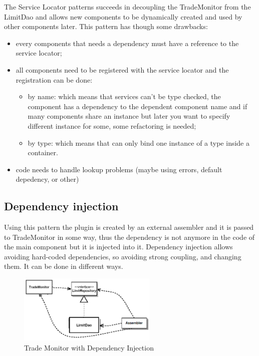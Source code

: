 The Service Locator patterns succeeds in decoupling the TradeMonitor from the LimitDao and allows new components to be dynamically created and used by other components later.
This pattern has though some drawbacks:
\begin{itemize}
    \item every components that needs a dependency must have a reference to the service locator;
    \item all components need to be registered with the service locator and the registration can be done:
    \begin{itemize}
        \item by name: which means that services can't be type checked, the component has a dependency to the dependent component name and if many components share an instance but later you want to specify different instance for some, some refactoring is needed;

        \item by type: which means that can only bind one instance of a type inside a container.
    \end{itemize}
    \item code needs to handle lookup problems (maybe using errors, default depedency, or other)
\end{itemize}

\subsection{Dependency injection}
Using this pattern the plugin is created by an external assembler and it is passed to TradeMonitor in some way, thus the dependency is not anymore in the code of the main component but it is injected into it.
Dependency injection allows avoiding hard-coded dependencies, so avoiding strong coupling, and changing them.
It can be done in different ways.
\begin{figure}[H]
    \centering
    \includegraphics[width=250px]{images/9_Frameworks/trade_monitor_dependency_injection.png}
    \caption{Trade Monitor with Dependency Injection}
\end{figure}

